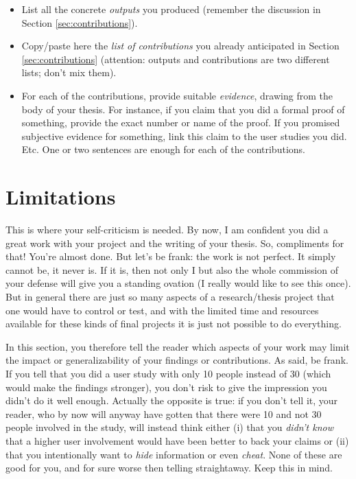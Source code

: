 \begin{itemize}
\item[\Square] List all the concrete \emph{outputs} you produced (remember the discussion in Section \ref{sec:contributions}).
\item[\Square] Copy/paste here the \emph{list of contributions} you already anticipated in Section \ref{sec:contributions} (attention: outputs and contributions are two different lists; don't mix them).
\item[\Square] For each of the contributions, provide suitable \emph{evidence}, drawing from the body of your thesis. For instance, if you claim that you did a formal proof of something, provide the exact number or name of the proof. If you promised subjective evidence for something, link this claim to the user studies you did. Etc. One or two sentences are enough for each of the contributions.
\end{itemize}


\section{Limitations}
This is where your self-criticism is needed. By now, I am confident you did a great work with your project and the writing of your thesis. So, compliments for that! You're almost done. But let's be frank: the work is not perfect. It simply cannot be, it never is. If it is, then not only I but also the whole commission of your defense will give you a standing ovation (I really would like to see this once). But in general there are just so many aspects of a research/thesis project that one would have to control or test, and with the limited time and resources available for these kinds of final projects it is just not possible to do everything.

In this section, you therefore tell the reader which aspects of your work may limit the impact or generalizability of your findings or contributions. As said, be frank. If you tell that you did a user study with only 10 people instead of 30 (which would make the findings stronger), you don't risk to give the impression you didn't do it well enough. Actually the opposite is true: if you don't tell it, your reader, who by now will anyway have gotten that there were 10 and not 30 people involved in the study, will instead think either (i) that you \emph{didn't know} that a higher user involvement would have been better to back your claims or (ii) that you intentionally want to \emph{hide} information or even \emph{cheat}. None of these are good for you, and for sure worse then telling straightaway. Keep this in mind.

